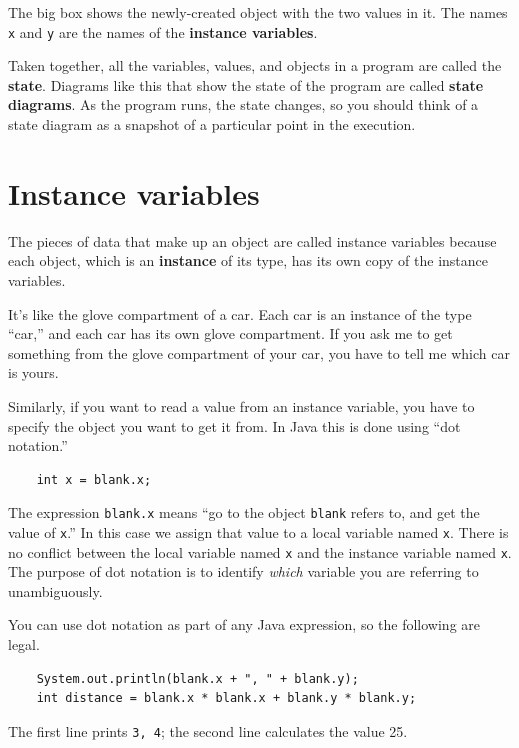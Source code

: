 \documentclass[12pt]{book}
\theoremstyle{exercise}
\begin{document}
The big box shows the newly-created object with the two values
in it.  The names {\tt x} and {\tt y} are the names of the {\bf
instance variables}.

Taken together, all the variables, values, and objects in a
program are called the {\bf state}.  Diagrams like this that
show the state of the program are called {\bf state diagrams}.
As the program runs, the state changes, so you should think
of a state diagram as a snapshot of a particular point in the
execution.


\section{Instance variables}

The pieces of data that make up an object are called instance
variables because each object, which is an {\bf instance} of its
type, has its own copy of the instance variables.

It's like the glove compartment of a car.  Each car is an instance
of the type ``car,'' and each car has its own glove compartment.  If
you ask me to get something from the glove compartment of your car,
you have to tell me which car is yours.


Similarly, if you want to read a value from an instance variable, you
have to specify the object you want to get it from.  In Java this is
done using ``dot notation.''

\begin{lstlisting}
    int x = blank.x;
\end{lstlisting}
%
The expression {\tt blank.x} means ``go to the object {\tt blank}
refers to, and get the value of {\tt x}.''  In this case we assign
that value to a local variable named {\tt x}.  There is no
conflict between the local variable named {\tt x} and the instance
variable named {\tt x}.  The purpose of dot notation is to identify
{\em which} variable you are referring to unambiguously.

You can use dot notation as part of any Java expression, so the
following are legal.

\begin{lstlisting}
    System.out.println(blank.x + ", " + blank.y);
    int distance = blank.x * blank.x + blank.y * blank.y;
\end{lstlisting}
%
The first line prints {\tt 3, 4}; the second line calculates
the value 25.
\end{document}
